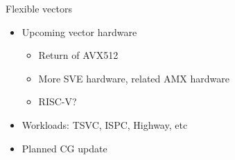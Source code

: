 \documentclass{beamer}
\begin{document}
\begin{frame}{Flexible vectors}
\begin{itemize}
\item Upcoming vector hardware
  \begin{itemize}
  \item Return of AVX512
  \item More SVE hardware, related AMX hardware
  \item RISC-V?
  \end{itemize}
\item Workloads: TSVC, ISPC, Highway, etc
\item Planned CG update
\end{itemize}
\end{frame}
\end{document}

